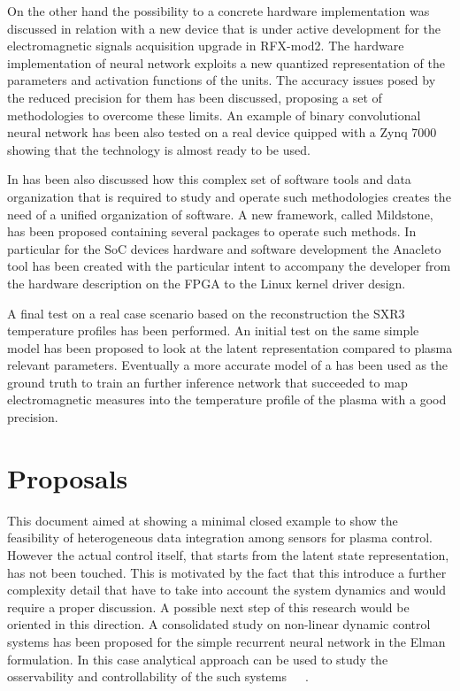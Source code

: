 On the other hand the possibility to a concrete hardware implementation was discussed in relation with a new device that is under active development for the electromagnetic signals acquisition upgrade in RFX-mod2.
The hardware implementation of neural network exploits a new quantized representation of the parameters and activation functions of the units. The accuracy issues posed by the reduced precision for them has been discussed, proposing a set of methodologies to overcome these limits. An example of binary convolutional neural network has been also tested on a real device quipped with a Zynq 7000 showing that the technology is almost ready to be used.

In has been also discussed how this complex set of software tools and data organization that is required to study and operate such methodologies creates the need of a unified organization of software. 
A new framework, called Mildstone, has been proposed containing several packages to operate such methods.
In particular for the SoC devices hardware and software development the Anacleto tool has been created with the particular intent to accompany the developer from the hardware description on the FPGA to the Linux kernel driver design.

A final test on a real case scenario based on the reconstruction the SXR3 temperature profiles has been performed.
An initial test on the same  simple model has been proposed to look at the latent representation compared to plasma relevant parameters. Eventually a more accurate model of a  has been used as the ground truth to train an further inference network that succeeded to map electromagnetic measures into the temperature profile of the plasma with a good precision.

\clearpage
\section{Proposals}

This document aimed at showing a minimal closed example to show the feasibility of heterogeneous data integration among sensors for plasma control. However the actual control itself, that starts from the latent state representation, has not been touched.
This is motivated by the fact that this introduce a further complexity detail that have to take into account the system dynamics and would require a proper discussion.
A possible next step of this research would be oriented in this direction. A consolidated study on non-linear dynamic control systems has been proposed for the simple recurrent neural network in the Elman formulation. In this case analytical approach can be used to study the osservability and controllability of the such systems~\cite{albertini1995forward}~\cite{albertini1994state}~\cite{sontag1997complete}.

